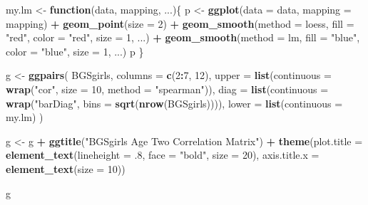 \documentclass[]{article}
\newenvironment{Shaded}{\begin{snugshade}}{\end{snugshade}}
\newcommand{\KeywordTok}[1]{\textcolor[rgb]{0.13,0.29,0.53}{\textbf{#1}}}
\newcommand{\DataTypeTok}[1]{\textcolor[rgb]{0.13,0.29,0.53}{#1}}
\newcommand{\DecValTok}[1]{\textcolor[rgb]{0.00,0.00,0.81}{#1}}
\newcommand{\StringTok}[1]{\textcolor[rgb]{0.31,0.60,0.02}{#1}}
\newcommand{\ControlFlowTok}[1]{\textcolor[rgb]{0.13,0.29,0.53}{\textbf{#1}}}
\newcommand{\OperatorTok}[1]{\textcolor[rgb]{0.81,0.36,0.00}{\textbf{#1}}}
\newcommand{\NormalTok}[1]{#1}
\begin{document}
\begin{Shaded}
\begin{Highlighting}[]
\NormalTok{my.lm <-}\StringTok{ }\ControlFlowTok{function}\NormalTok{(data, mapping, ...)\{}
\NormalTok{  p <-}\StringTok{ }\KeywordTok{ggplot}\NormalTok{(}\DataTypeTok{data =}\NormalTok{ data, }\DataTypeTok{mapping =}\NormalTok{ mapping) }\OperatorTok{+}\StringTok{ }
\StringTok{    }\KeywordTok{geom_point}\NormalTok{(}\DataTypeTok{size =} \DecValTok{2}\NormalTok{) }\OperatorTok{+}\StringTok{ }
\StringTok{    }\KeywordTok{geom_smooth}\NormalTok{(}\DataTypeTok{method =}\NormalTok{ loess, }\DataTypeTok{fill =} \StringTok{"red"}\NormalTok{, }\DataTypeTok{color =} \StringTok{"red"}\NormalTok{, }\DataTypeTok{size =} \DecValTok{1}\NormalTok{, ...) }\OperatorTok{+}
\StringTok{    }\KeywordTok{geom_smooth}\NormalTok{(}\DataTypeTok{method =}\NormalTok{ lm, }\DataTypeTok{fill =} \StringTok{"blue"}\NormalTok{, }\DataTypeTok{color =} \StringTok{"blue"}\NormalTok{, }\DataTypeTok{size =} \DecValTok{1}\NormalTok{, ...)}
\NormalTok{  p}
\NormalTok{\}}


\NormalTok{g <-}\StringTok{ }\KeywordTok{ggpairs}\NormalTok{(}
\NormalTok{        BGSgirls, }
        \DataTypeTok{columns =} \KeywordTok{c}\NormalTok{(}\DecValTok{2}\OperatorTok{:}\DecValTok{7}\NormalTok{, }\DecValTok{12}\NormalTok{),}
        \DataTypeTok{upper =} \KeywordTok{list}\NormalTok{(}\DataTypeTok{continuous =} \KeywordTok{wrap}\NormalTok{(}\StringTok{"cor"}\NormalTok{, }\DataTypeTok{size =} \DecValTok{10}\NormalTok{, }\DataTypeTok{method =} \StringTok{"spearman"}\NormalTok{)),}
        \DataTypeTok{diag =} \KeywordTok{list}\NormalTok{(}\DataTypeTok{continuous =} \KeywordTok{wrap}\NormalTok{(}\StringTok{"barDiag"}\NormalTok{, }\DataTypeTok{bins =} \KeywordTok{sqrt}\NormalTok{(}\KeywordTok{nrow}\NormalTok{(BGSgirls)))),}
        \DataTypeTok{lower =} \KeywordTok{list}\NormalTok{(}\DataTypeTok{continuous =}\NormalTok{ my.lm)}
\NormalTok{        )}

\NormalTok{g <-}\StringTok{ }\NormalTok{g }\OperatorTok{+}\StringTok{ }\KeywordTok{ggtitle}\NormalTok{(}\StringTok{"BGSgirls Age Two Correlation Matrix"}\NormalTok{) }\OperatorTok{+}\StringTok{ }
\StringTok{        }\KeywordTok{theme}\NormalTok{(}\DataTypeTok{plot.title =} \KeywordTok{element_text}\NormalTok{(}\DataTypeTok{lineheight =}\NormalTok{ .}\DecValTok{8}\NormalTok{,}
                                        \DataTypeTok{face =} \StringTok{"bold"}\NormalTok{,}
                                        \DataTypeTok{size =} \DecValTok{20}\NormalTok{), }
              \DataTypeTok{axis.title.x =} \KeywordTok{element_text}\NormalTok{(}\DataTypeTok{size =} \DecValTok{10}\NormalTok{))}

\NormalTok{g}
\end{Highlighting}
\end{Shaded}
\end{document}
